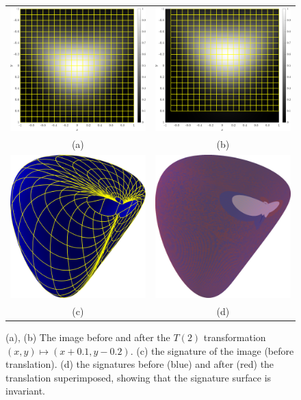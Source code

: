 \documentclass{artjlt}
\begin{document}
\begin{figure}
  \centering
  \begin{tabular}{cc}
  \includegraphics[width=.45\textwidth]{Figs/function_scanlines} &
  \includegraphics[width=.45\textwidth]{Figs/f_transformed_T2} \\
  (a) & (b) \\
  \includegraphics[width=.45\textwidth]{Figs/T2_signature} &
  \includegraphics[width=.45\textwidth]{Figs/T2_match} \\
  (c) & (d)
  \end{tabular}
  \caption{(a), (b) The image before and after the $T(2)$ transformation $(x,
  y) \mapsto (x + 0.1, y - 0.2)$. (c) the signature of the
  image (before translation). (d) the signatures before (blue) and after (red)
  the translation superimposed, showing that the signature surface is invariant.}\label{fig:T2}
\end{figure}
\end{document}
